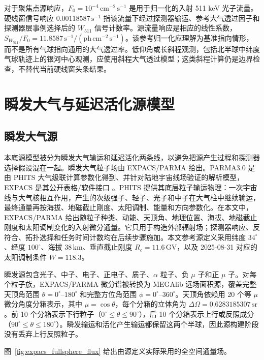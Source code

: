 \documentclass[preprint,12pt]{elsarticle}
\newcommand{\cms}{\,\mathrm{cm^{-2}\,s^{-1}}}
\newcommand{\cps}{\,\mathrm{s^{-1}}}
\newcommand{\wii}{W_{511}}
\newcommand{\fzero}{F_{0}}
\begin{document}
对于聚焦点源响应，$\fzero=10^{-4}\cms$ 是用于归一化的入射 511 keV 光子流量。硬线窗信号响应 $0.00118587\cps$ 指该流量下经过探测器输运、参考大气透过因子和探测器层事例选择后的 $\wii$ 信号计数率。源流量响应是相应的线性系数，$S_{\wii}/\fzero=11.8587\,\mathrm{s^{-1}}/(\mathrm{ph\,cm^{-2}\,s^{-1}})$。该参考归一化应理解为基准指向情形，而不是所有气球指向通用的大气透过率。低仰角或长斜程观测，包括北半球中纬度气球轨迹上的银河中心观测，应使用斜程大气透过模型；这类斜程计算仍是边界检查，不替代当前硬线窗头条结果。

\section{瞬发大气与延迟活化源模型}
\label{sec:background}

\subsection{瞬发大气源}
\label{subsec:prompt_source}

本底源模型被分为瞬发大气输运和延迟活化两条线，以避免把源产生过程和探测器选择假设混在一起。瞬发大气粒子场由 EXPACS/PARMA 给出。PARMA3.0 是由 PHITS 大气级联计算参数化得到、并针对陆地宇宙线场验证的解析模型，EXPACS 是其公开表格/软件接口 \cite{Sato2015EXPACS}。PHITS 提供其底层粒子输运物理：一次宇宙线与大气核相互作用，产生的次级强子、轻子、光子和中子在大气柱中继续输运，最终通量再按海拔、地磁截止刚度、太阳调制、能量和方向参数化。在本文中，EXPACS/PARMA 给出随粒子种类、动能、天顶角、地理位置、海拔、地磁截止刚度和太阳调制变化的入射微分通量。它只用于构造外部辐射场；探测器响应、反符合、拓扑选择和任务时间计数均在后续步骤施加。本文参考源定义采用纬度 $34^\circ$、经度 $100^\circ$、海拔 $38\,\mathrm{km}$、垂直截止刚度 $R_c=11.6\,\mathrm{GV}$，以及 2025-08-31 对应的太阳调制条件 $W=118.3$。

瞬发源包含光子、中子、电子、正电子、质子、$\alpha$ 粒子、负 $\mu$ 子和正 $\mu$ 子。对每个粒子族，EXPACS/PARMA 微分谱被转换为 MEGAlib 远场面积源，覆盖完整天顶角范围 $\theta=0^\circ$--$180^\circ$ 和完整方位角范围 $\phi=0^\circ$--$360^\circ$。天顶角依赖用 20 个等 $\mu$ 微分角度分箱表示，其中 $\mu=\cos\theta$，每个分箱的立体角为 $\Delta\Omega=0.6283185307\,\mathrm{sr}$。前 10 个分箱表示下行粒子（$0^\circ\leq\theta\leq90^\circ$），后 10 个分箱表示上行或反照成分（$90^\circ\leq\theta\leq180^\circ$）。瞬发输运和活化产生输运都保留这两个半球，因此源构建阶段没有丢弃上行反照粒子。

图~\ref{fig:expacs_fullsphere_flux} 给出由源定义实际采用的全空间通量场。
\end{document}
